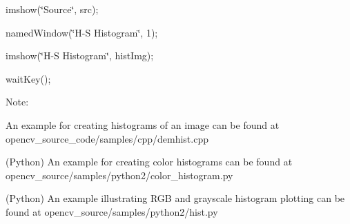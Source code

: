 {\ttfamily imshow(\char`\"{}\+Source\char`\"{}, src);}

{\ttfamily }

{\ttfamily }

{\ttfamily named\+Window(\char`\"{}\+H-\/\+S Histogram\char`\"{}, 1);}

{\ttfamily }

{\ttfamily }

{\ttfamily imshow(\char`\"{}\+H-\/\+S Histogram\char`\"{}, hist\+Img);}

{\ttfamily }

{\ttfamily }

{\ttfamily wait\+Key();}

{\ttfamily }

{\ttfamily }

{\ttfamily Note\+: }


\begin{DoxyItemize}
\item An example for creating histograms of an image can be found at opencv\+\_\+source\+\_\+code/samples/cpp/demhist.\+cpp 
\item (Python) An example for creating color histograms can be found at opencv\+\_\+source/samples/python2/color\+\_\+histogram.\+py 
\item (Python) An example illustrating R\+GB and grayscale histogram plotting can be found at opencv\+\_\+source/samples/python2/hist.\+py 
\end{DoxyItemize}


